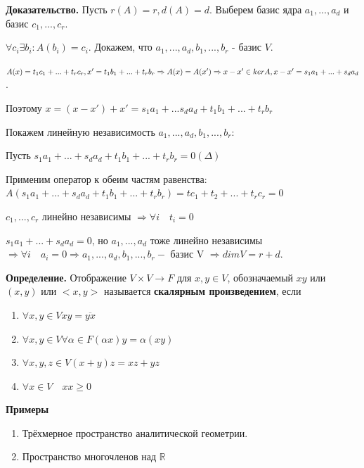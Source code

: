 \documentclass[a4paper]{article}
\begin{document}
\begin{hproof}
\textbf{Доказательство.} Пусть $r(A) = r, d(A) = d$. Выберем базис ядра $a_1, ..., a_d$ и базис $c_1, ..., c_r$.

$\forall c_i \exists b_i: A(b_i) = c_i$. Докажем, что $a_1, ..., a_d, b_1, ..., b_r$ - базис $V$.

$A(x) = t_1c_1 + ... + t_rc_r, x' = t_1b_1 + ... + t_rb_r\\ \Rightarrow A(x) = A(x') \Rightarrow x-x' \in kerA, x-x' = s_1a_1 + ... + s_da_d$.

Поэтому $x=(x-x')+x' = s_1a_1 + ... s_da_d + t_1b_1 + ... + t_rb_r$

Покажем линейную независимость $a_1, ..., a_d, b_1, ..., b_r$:

Пусть $s_1a_1 + ... + s_da_d + t_1b_1 + ... +t_rb_r = 0 (\Delta)$

Применим оператор к обеим частям равенства: $A(s_1a_1 + ... + s_da_d + t_1b_1 + ... +t_rb_r) = tc_1 + t_2 + ... + t_rc_r = 0$

$c_1, ..., c_r$ линейно независимы $\Rightarrow \forall i \quad  t_i = 0$

$s_1a_1 + ... + s_da_d = 0$, но $a_1, ..., a_d$ тоже линейно независимы $\Rightarrow \forall i \quad  a_i = 0 \Rightarrow a_1, ..., a_d, b_1, ..., b_r -$ базис V $\Rightarrow dimV = r+d$.
\end{hproof}


\newpage \begin{center}\begin{Large}\end{Large}\end{center}

\textbf{Определение.} Отображение $V \times V \rightarrow F$ для $x, y \in V$, обозначаемый $xy$ или $(x,y)$ или $<x,y>$ называется \textbf{скалярным произведением}, если 
\begin{enumerate}
\item $\forall x, y \in V xy =  \overline{yx}$
\item $\forall x,y \in V \forall \alpha \in F (\alpha x) y = \alpha (xy)$
\item $\forall x, y, z \in V (x+y)z = xz + yz$
\item $\forall x \in V \quad xx \geq 0$
\end{enumerate}
\textbf{Примеры}

\begin{enumerate}
\item Трёхмерное пространство аналитической геометрии.
\item Пространство многочленов над $\mathbb{R}$
\end{enumerate}
\end{document}
